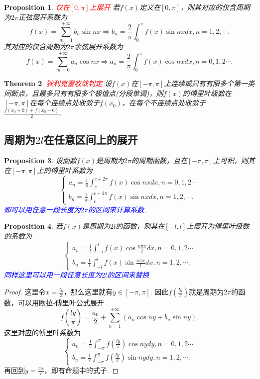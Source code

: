 \documentclass{article}
\newtheorem{theorem}{Theorem}[section]
\newtheorem{proposition}[theorem]{Proposition}
\newcommand{\redt}[1]{\textcolor{red}{#1}}
\newcommand{\bluet}[1]{\textcolor{blue}{#1}}
\begin{document}
\begin{proposition}
\rm \redt{仅在$[0,\pi]$上展开} 若$f(x)$定义在$[0,\pi]$，则其对应的仅含周期为$2\pi$正弦展开系数为
$$
f(x) = \sum\limits_{m=1}^{+\infty}b_n\sin nx \Rightarrow b_n = \frac{2}{\pi} \int_{0}^{\pi} f(x)\sin nx dx,n = 1,2,\cdots.
$$
其对应的仅含周期为$2\pi$余弦展开系数为
$$
f(x) = \sum\limits_{m=0}^{+\infty}a_n\cos nx \Rightarrow a_n = \frac{2}{\pi} \int_{0}^{\pi} f(x)\cos nx dx, n = 0,1,2\cdots. 
$$
\end{proposition}

\begin{theorem}
\rm \redt{狄利克雷收敛判定} 设$f(x)$在$[-\pi,\pi]$上连续或只有有限多个第一类间断点，且最多只有有限多个极值点(分段单调)，则$f(x)$的傅里叶级数在$[-\pi,\pi]$在每个连续点处收敛于$f(x_0)$，在每个不连续点处收敛于$\frac{f(x_0 + 0) + f(x_0-0)}{2}$. 
\end{theorem}

\subsection{周期为$2l$在任意区间上的展开}

\begin{proposition}
\rm 设函数$f(x)$是周期为$2\pi$的周期函数，且在$[-\pi,\pi]$上可积，则其在$[-\pi,\pi]$上的傅里叶系数为
$$
\left\{
\begin{array}{ll}
a_n = \frac{1}{\pi} \int_{c}^{c+2\pi} f(x)\cos nxdx, n =  0,1,2\cdots \\
b_n = \frac{1}{\pi} \int_{c}^{c+2\pi} f(x)\sin nxdx, n = 1,2,\cdots.
\end{array} \right.
$$
\bluet{即可以用任意一段长度为$2\pi$的区间来计算系数}.
\end{proposition}

\begin{proposition}
\rm 若$f(x)$是周期为$2l$的函数，则其在$[-l,l]$上展开为傅里叶级数的系数为
$$
\left\{
\begin{array}{ll}
a_n = \frac{1}{l} \int_{-l}^{l} f(x)\cos \frac{n\pi x}{l}dx, n =  0,1,2 \cdots \\
b_n = \frac{1}{l} \int_{-l}^{l} f(x)\sin \frac{n\pi x}{l}dx, n = 1,2,\cdots.
\end{array} \right.
$$
\bluet{同样这里可以用一段任意长度为$2l$的区间来替换}
\end{proposition}

\begin{proof}
\rm 这里令$x=\frac{ly}{\pi}$，那么这里就有$y \in [-\pi,\pi]$. 因此$f(\frac{ly}{\pi})$就是周期为$2\pi$的函数，可以用欧拉-傅里叶公式展开
$$
f\left(\frac{ly}{\pi}\right) = \frac{a_0}{2} + \sum\limits_{n=1}^{+\infty}(a_n\cos ny + b_n \sin ny).  
$$
这里对应的傅里叶系数为
$$
\left\{
\begin{array}{ll}
a_n = \frac{1}{\pi} \int_{-\pi}^{\pi} f\left(\frac{ly}{\pi}\right)\cos nydy, n =  0,1,2\cdots \\
b_n = \frac{1}{\pi} \int_{-\pi}^{\pi} f\left(\frac{ly}{\pi}\right)\sin nydy, n = 1,2,\cdots.
\end{array} \right.
$$
再回到$y = \frac{\pi x}{l}$，即有命题中的式子. 
\end{proof}
\end{document}
